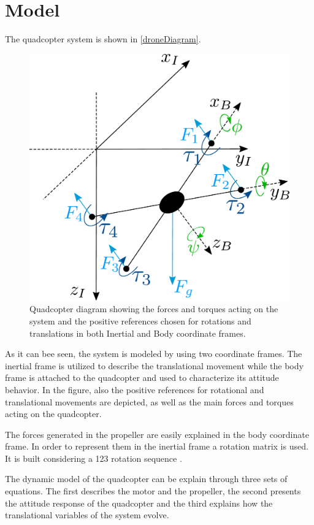 \section{Model}
The quadcopter system is shown in \autoref{droneDiagram}. 
\begin{figure}[H]
	\centering
	\includegraphics[scale=0.3]{figures/droneDiagram}
	\caption{Quadcopter diagram showing the forces and torques acting on the system and the positive references chosen for rotations and translations in both Inertial and Body coordinate frames.}
	\label{droneDiagram}
\end{figure}
%
As it can bee seen, the system is modeled by using two coordinate frames. The inertial frame is utilized to describe the translational movement while the body frame is attached to the quadcopter and used to characterize its attitude behavior. In the figure, also the positive references for rotational and translational movements are depicted, as well as the main forces and torques acting on the quadcopter. 

The forces generated in the propeller are easily explained in the body coordinate frame. In order to represent them in the inertial frame a rotation matrix is used. It is built considering a 123 rotation sequence \cite{rotationmatrix}.
 
The dynamic model of the quadcopter can be explain through three sets of equations. The first describes the motor and the propeller, the second presents the attitude response of the quadcopter and the third explains how the translational variables of the system evolve.

